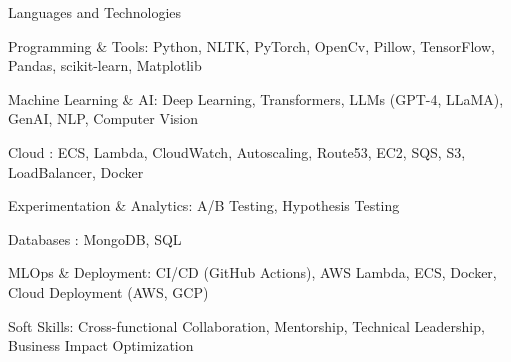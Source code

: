 

\begin{cventries}

  \cventry
    {Languages and Technologies}
    {}
    {}
    {}
    {
     \begin{cvitems} %
      \item {Programming \& Tools: Python, NLTK, PyTorch, OpenCv, Pillow, TensorFlow, Pandas, scikit-learn, Matplotlib}	
      \item {Machine Learning \& AI: Deep Learning, Transformers, LLMs (GPT-4, LLaMA), GenAI, NLP, Computer Vision}	
      \item {Cloud : ECS, Lambda, CloudWatch, Autoscaling, Route53, EC2, SQS, S3, LoadBalancer, Docker}
      \item {Experimentation \& Analytics:  A/B Testing, Hypothesis Testing}
	    \item {Databases : MongoDB, SQL}
      \item {MLOps \& Deployment: CI/CD (GitHub Actions), AWS Lambda, ECS, Docker, Cloud Deployment (AWS, GCP)}
      \item {Soft Skills: Cross-functional Collaboration, Mentorship, Technical Leadership, Business Impact Optimization}
     \end{cvitems}
    }

\end{cventries}
